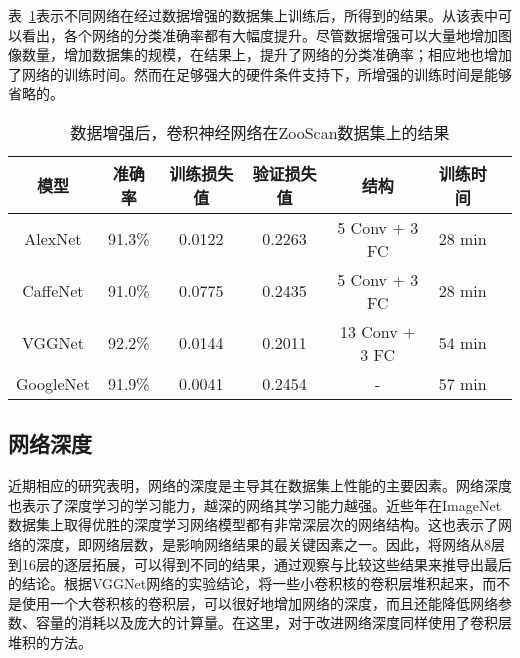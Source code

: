 表~\ref{tab:da}表示不同网络在经过数据增强的数据集上训练后，所得到的结果。从该表中可以看出，各个网络的分类准确率都有大幅度提升。尽管数据增强可以大量地增加图像数量，增加数据集的规模，在结果上，提升了网络的分类准确率；相应地也增加了网络的训练时间。然而在足够强大的硬件条件支持下，所增强的训练时间是能够省略的。

\begin{table}[H]
\centering
\caption{数据增强后，卷积神经网络在ZooScan数据集上的结果}
\label{tab:da}
\vspace{0.2em}
\begin{tabular}{|c|c|c|c|c|c|c|}
\hline 模型 & 准确率 & 训练损失值 & 验证损失值 & 结构 & 训练时间\\ 
\hline AlexNet  & 91.3\% & 0.0122 & 0.2263 & 5 Conv + 3 FC  & 28 min \\
\hline CaffeNet & 91.0\% & 0.0775 & 0.2435 & 5 Conv + 3 FC  & 28 min \\
\hline VGGNet  & 92.2\% & 0.0144 & 0.2011 & 13 Conv + 3 FC  & 54 min \\
\hline GoogleNet & 91.9\% & 0.0041 & 0.2454 & - &  57 min \\
\hline  
\end{tabular}
\end{table}



\subsection{网络深度}
近期相应的研究表明，网络的深度是主导其在数据集上性能的主要因素。网络深度也表示了深度学习的学习能力，越深的网络其学习能力越强。近些年在ImageNet数据集上取得优胜的深度学习网络模型都有非常深层次的网络结构。这也表示了网络的深度，即网络层数，是影响网络结果的最关键因素之一。因此，将网络从8层到16层的逐层拓展，可以得到不同的结果，通过观察与比较这些结果来推导出最后的结论。根据VGGNet网络的实验结论，将一些小卷积核的卷积层堆积起来，而不是使用一个大卷积核的卷积层，可以很好地增加网络的深度，而且还能降低网络参数、容量的消耗以及庞大的计算量。在这里，对于改进网络深度同样使用了卷积层堆积的方法。

